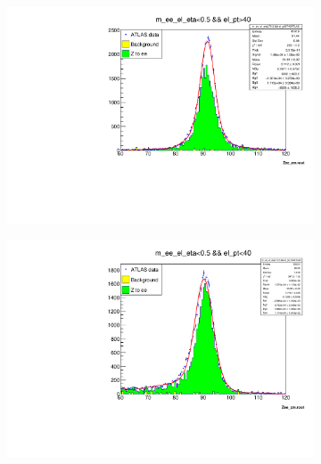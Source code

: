     \begin{figure}
        \begin{subfigure}{0.5\textwidth}
            \includegraphics[width=\textwidth]{../W_mass/Z_mass_check_eta-small_pt-large.pdf}
        \end{subfigure}
        \begin{subfigure}{0.5\textwidth}
            \includegraphics[width=\textwidth]{../W_mass/Z_mass_check_eta-small_pt-small.pdf}
        \end{subfigure}
        \begin{subfigure}{0.5\textwidth}

\end{subfigure}
\end{figure}
